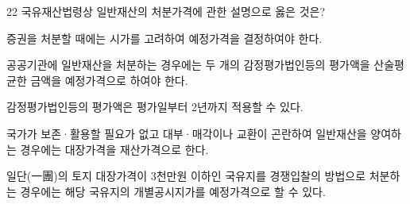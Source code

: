 \begin{question}{22}
국유재산법령상 일반재산의 처분가격에 관한 설명으로 옳은 것은?
\begin{choices}
  \item 증권을 처분할 때에는 시가를 고려하여 예정가격을 결정하여야 한다.
  \item 공공기관에 일반재산을 처분하는 경우에는 두 개의 감정평가법인등의 평가액을 산술평균한 금액을 예정가격으로 하여야 한다.
  \item 감정평가법인등의 평가액은 평가일부터 2년까지 적용할 수 있다.
  \item 국가가 보존·활용할 필요가 없고 대부·매각이나 교환이 곤란하여 일반재산을 양여하는 경우에는 대장가격을 재산가격으로 한다.
  \item 일단(一團)의 토지 대장가격이 3천만원 이하인 국유지를 경쟁입찰의 방법으로 처분하는 경우에는 해당 국유지의 개별공시지가를 예정가격으로 할 수 있다.
\end{choices}
\end{question}
